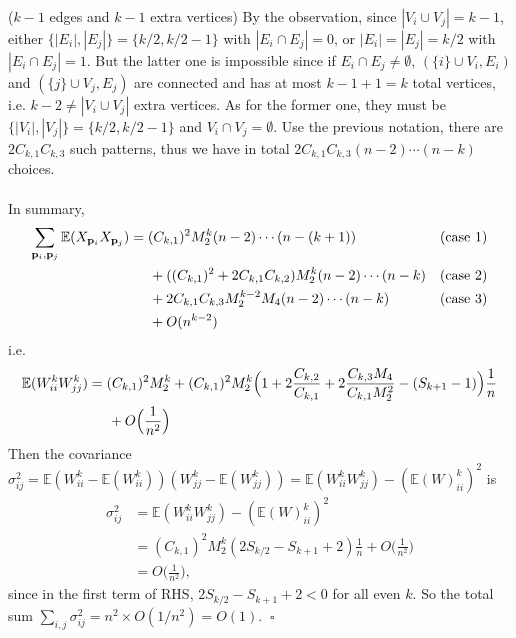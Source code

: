 \begin{answer}
($k-1$ edges and $k-1$ extra vertices) By the observation, since $|V_i\cup V_j|=k-1$, either $\{|E_i|,|E_j|\}=\{k/2, k/2-1\}$ with $|E_i\cap E_j|=0$, or $|E_i|=|E_j|=k/2$ with $|E_i\cap E_j|=1$. But the latter one is impossible since if $E_i\cap E_j\neq\emptyset$, $(\{i\}\cup V_i,E_i)$ and $(\{j\}\cup V_j, E_j)$ are connected and has at most $k-1+1=k$ total vertices, i.e. $k-2\neq|V_i\cup V_j|$ extra vertices. As for the former one, they must be $\{|V_i|,|V_j|\}=\{k/2,k/2-1\}$ and $V_i\cap V_j=\emptyset$. Use the previous notation, there are $2C_{k,1}C_{k,3}$ such patterns, thus we have in total $2C_{k,1}C_{k,3}(n-2)\cdots(n-k)$ choices.\\ \\
In summary,
\begin{equation*}
    \begin{aligned}
        \sum_{\mathbf{p}_i,\mathbf{p}_j}\mathbb{E}(X_{\mathbf{p}_i}X_{\mathbf{p}_j})&=
        (C_{k,1})^2M_2^k(n-2)\cdots(n-(k+1)) && (\text{case }1)\\&\hspace{0.5cm}
        +((C_{k,1})^2+2C_{k,1}C_{k,2})M_2^k(n-2)\cdots(n-k) && (\text{case }2)\\&\hspace{0.5cm}
        +2C_{k,1}C_{k,3}M_2^{k-2}M_4(n-2)\cdots(n-k) && (\text{case }3)\\&\hspace{0.5cm}
        +O(n^{k-2})
    \end{aligned}
\end{equation*}
i.e.
\begin{equation*}
    \begin{aligned}
        \mathbb{E}(W_{ii}^kW_{jj}^k)&=(C_{k,1})^2M_2^k+(C_{k,1})^2M_2^k\Big(1+2\frac{C_{k,2}}{C_{k,1}}+2\frac{C_{k,3}M_4}{C_{k,1}M_2^2}-(S_{k+1}-1)\Big)\frac{1}{n}\\&\hspace{0.5cm}
        +O\Big(\frac{1}{n^2}\Big)
    \end{aligned}
\end{equation*}
Then the covariance $\sigma_{ij}^2=\mathbb{E}(W_{ii}^k-\mathbb{E}(W_{ii}^k))(W_{jj}^k-\mathbb{E}(W_{jj}^k))=\mathbb{E}(W_{ii}^kW_{jj}^k)-(\mathbb{E}(W)_{ii}^k)^2$ is
\begin{equation*}
    \begin{aligned}
        \sigma_{ij}^2&=\mathbb{E}(W_{ii}^kW_{jj}^k)-(\mathbb{E}(W)_{ii}^k)^2\\&
        =(C_{k,1})^2M^k_2(2S_{k/2}-S_{k+1}+2)\frac{1}{n}+O\Big(\frac{1}{n^2}\Big)\\&
        = O\Big(\frac{1}{n^2}\Big),
    \end{aligned}
\end{equation*}
since in the first term of RHS, $2S_{k/2}-S_{k+1}+2<0$ for all even $k$. So the total sum $\sum_{i,j}\sigma_{ij}^2=n^2\times O(1/n^2)=O(1).\;\;\square$\\


\end{answer}
